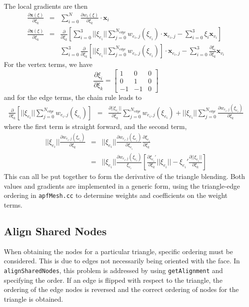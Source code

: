 \documentclass{article}
\begin{document}
The local gradients are then
\begin{eqnarray*}\frac{\partial \mathbf{x}(\xi)}{\partial \xi_k}& = & \sum_{i=0}^N \frac{\partial w_i(\xi)}{\partial \xi_k} \cdot \mathbf{x}_i \\
\frac{\partial \mathbf{x}(\xi)}{\partial \xi_k}& = & \frac{\partial}{\partial \xi_k}\left[\sum_{i=0}^{3}||\xi_{e_i}||\sum_{j=0}^{N_{edge}}w_{e_i,j}(\xi_{e_i})\cdot\mathbf{x}_{e_i,j}- \sum_{i=0}^{3}\xi_i\mathbf{x}_{v_i}\right] \\ & & 
\sum_{i=0}^{3}\frac{\partial}{\partial \xi_k}\left[||\xi_{e_i}||\sum_{j=0}^{N_{edge}}w_{e_i,j}(\xi_{e_i})\right]\cdot\mathbf{x}_{e_i,j}- \sum_{i=0}^{3} \frac{\partial \xi_i}{\partial \xi_k}\mathbf{x}_{v_i}\end{eqnarray*}
For the vertex terms, we have
\[ \frac{\partial \xi_i}{\partial \xi_k} = \left[ \begin{array}{ccc} 1 & 0 & 0 \\ 0 & 1 & 0 \\ -1 & -1 & 0 \end{array}\right]\]
and for the edge terms, the chain rule leads to
\begin{eqnarray*}\frac{\partial}{\partial \xi_k}\left[||\xi_{e_i}||\sum_{j=0}^{N_{edge}}w_{e_i,j}(\xi_{e_i})\right] & = & \frac{\partial ||\xi_{e_i}||}{\partial \xi_k}\sum_{j=0}^{N_{edge}}w_{e_i,j}(\xi_{e_i}) + ||\xi_{e_i}||\sum_{j=0}^{N_{edge}}\frac{\partial w_{e_i,j}(\xi_{e_i})}{\partial \xi_k}

\end{eqnarray*}
where the first term is straight forward, and the second term, 
\begin{eqnarray*}
||\xi_{e_i}||\frac{\partial w_{e_i,j}(\xi_{e_i})}{\partial \xi_k} & = & 
||\xi_{e_i}||\frac{\partial w_{e_i,j}(\xi_{e_i})}{\partial \xi_{e_i}}\frac{\partial \xi_{e_i}}{\partial \xi_k} \\ & = & 
||\xi_{e_i}||\frac{\partial w_{e_i,j}(\xi_{e_i})}{\xi_{e_i}}\left[\frac{\partial \xi_{e_i}'}{\partial \xi_k}||\xi_{e_i}||-\xi_{e_i}'\frac{\partial ||\xi_{e_i}||}{\partial \xi_k} \right]

\end{eqnarray*}
This can all be put together to form the derivative of the triangle blending. Both values and gradients are implemented in a generic form, using the triangle-edge ordering in \texttt{apfMesh.cc} to determine weights and coefficients on the weight terms. 

\subsection{Align Shared Nodes}
When obtaining the nodes for a particular triangle, specific ordering must be considered. This is due to edges not necessarily being oriented with the face. In \texttt{alignSharedNodes}, this problem is addressed by using \texttt{getAlignment} and specifying the order. If an edge is flipped with respect to the triangle, the ordering of the edge nodes is reversed and the correct ordering of nodes for the triangle is obtained.
\end{document}
